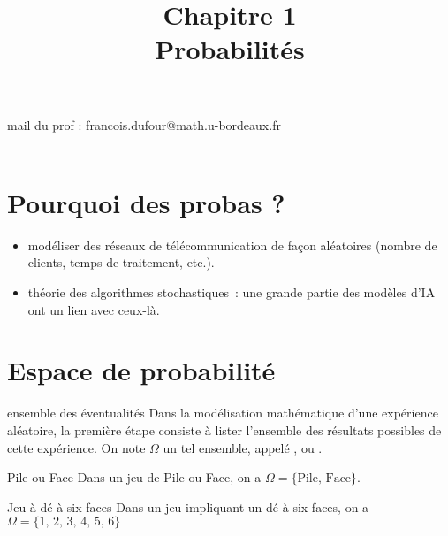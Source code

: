 

\setcounter{chapitre}{1}

\title{\Large Chapitre 1 \\ \Huge Probabilités}



\maketitle

\newcommand{\tribu}[0]{\mathcal{T}}
\newcommand{\univ}[0]{\Omega}
\newcommand{\proba}[0]{\mathbb{P}}

mail du prof : francois.dufour@math.u-bordeaux.fr
\\ \\
\section*{Pourquoi des probas ?}
\begin{itemize}
    \item modéliser des réseaux de télécommunication de façon aléatoires (nombre de clients, temps de traitement, etc.).
    \item théorie des algorithmes stochastiques~: une grande partie des modèles d'IA ont un lien avec ceux-là.
\end{itemize}

\section{Espace de probabilité}

\begin{definition}{}{ensemble des éventualités}
    Dans la modélisation mathématique d'une expérience aléatoire, la première étape consiste à lister l'ensemble des résultats possibles de cette expérience. On note $\Omega$ un tel ensemble, appelé , ou .
\end{definition}

\begin{exemple}{}{Pile ou Face}
    Dans un jeu de Pile ou Face, on a $\Omega = \{\text{Pile},\, \text{Face}\}$.
\end{exemple}

\begin{exemple}{}{Jeu à dé à six faces}
    Dans un jeu impliquant un dé à six faces, on a $\Omega = \{1,\, 2,\, 3,\, 4,\, 5,\, 6\}$
    
\end{exemple}

